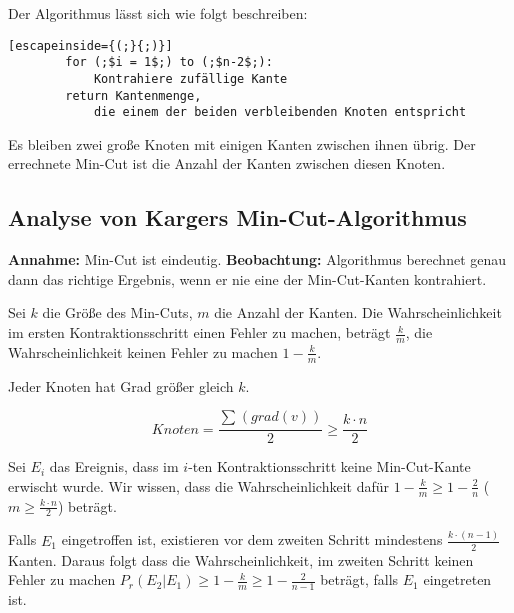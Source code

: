 \documentclass{scrartcl}%
\begin{document}
    Der Algorithmus lässt sich wie folgt beschreiben:

    \begin{lstlisting}[escapeinside={(;}{;)}]
        for (;$i = 1$;) to (;$n-2$;):
            Kontrahiere zufällige Kante
        return Kantenmenge,
            die einem der beiden verbleibenden Knoten entspricht
    \end{lstlisting}

    Es bleiben zwei große Knoten mit einigen Kanten zwischen ihnen übrig.
    Der errechnete Min-Cut ist die Anzahl der Kanten zwischen diesen Knoten.

    \subsection*{Analyse von Kargers Min-Cut-Algorithmus}\label{subsec:analyseVonKargersMincut-algorithmus}

    \textbf{\textsf{Annahme:}}  Min-Cut ist eindeutig.
    \newline
    \textbf{\textsf{Beobachtung:}} Algorithmus berechnet genau dann das richtige Ergebnis, wenn er nie eine der Min-Cut-Kanten kontrahiert.

    Sei $k$ die Größe des Min-Cuts, $m$ die Anzahl der Kanten.
    Die Wahrscheinlichkeit im ersten Kontraktionsschritt einen Fehler zu machen, beträgt $\frac{k}{m}$,
    die Wahrscheinlichkeit keinen Fehler zu machen $1-\frac{k}{m}$.

    {
        Jeder Knoten hat Grad größer gleich $k$.

        \begin{equation*}
            Knoten = \frac{\sum_{}^{}(grad(v))}{2} \geq \frac{k \cdot n}{2}
        \end{equation*}
    }

    Sei $E_i$ das Ereignis, dass im $i$-ten Kontraktionsschritt keine Min-Cut-Kante erwischt wurde.
    Wir wissen, dass die Wahrscheinlichkeit dafür $1-\frac{k}{m} \geq 1 - \frac{2}{n}$
    ($m \geq \frac{k \cdot n}{2}$) beträgt.

    Falls $E_1$ eingetroffen ist, existieren vor dem zweiten Schritt mindestens $\frac{k \cdot (n-1)}{2}$ Kanten.
    Daraus folgt dass die Wahrscheinlichkeit, im zweiten Schritt keinen Fehler zu machen
    $P_r(E_2 | E_1) \geq 1 - \frac{k}{m} \geq 1 - \frac{2}{n-1}$ beträgt, falls $E_1$ eingetreten ist.
\end{document}
